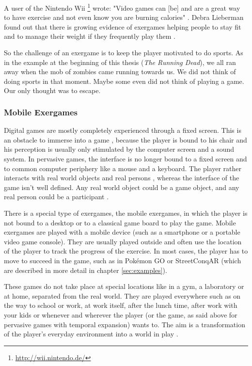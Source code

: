 A user of the Nintendo Wii \footnote{\url{http://wii.nintendo.de/}} wrote: "Video games can [be] and are a great way to have exercise and not even know you are burning calories" \citep{WiiSportsWeightLoss}. Debra Lieberman found out that there is growing evidence of exergames helping people to stay fit and to manage their weight if they frequently play them \citep{Lieberman06dancegames}.

So the challenge of an exergame is to keep the player motivated to do sports. As in the example at the beginning of this thesis (\emph{The Running Dead}), we all ran away when the mob of zombies came running towards us. We did not think of doing sports in that moment. Maybe some even did not think of playing a game. Our only thought was to escape.

\subsubsection{Mobile Exergames}
Digital games are mostly completely experienced through a fixed screen. This is an obstacle to immerse into a game \citep{cheok2002touch}, because the player is bound to his chair and his perception is usually only stimulated by the computer screen and a sound system. In pervasive games, the interface is no longer bound to a fixed screen and to common computer periphery like a mouse and a keyboard. The player rather interacts with real world objects and real persons \citep{nieuwdorp2009pervasive}, whereas the interface of the game isn't well defined. Any real world object could be a game object, and any real person could be a participant \citep{montola2005exploring}.

There is a special type of exergames, the mobile exergames, in which the player is not bound to a desktop or to a classical game board to play the game. Mobile exergames are played with a mobile device (such as a smartphone or a portable video game console). They are usually played outside and often use the location of the player to track the progress of the exercise. In most cases, the player has to move to succeed in the game, such as in Pok\'{e}mon GO or StreetConqAR (which are described in more detail in chapter \ref{sec:examples}).

These games do not take place at special locations like in a gym, a laboratory or at home, separated from the real world. They are played everywhere such as on the way to school or work, at work itself, after the lunch time, after work with your kids or whenever and wherever the player (or the game, as said above for pervasive games with temporal expansion) wants to. The aim is a transformation of the player's everyday environment into a world in play \citep{nieuwdorp2009pervasive}.


